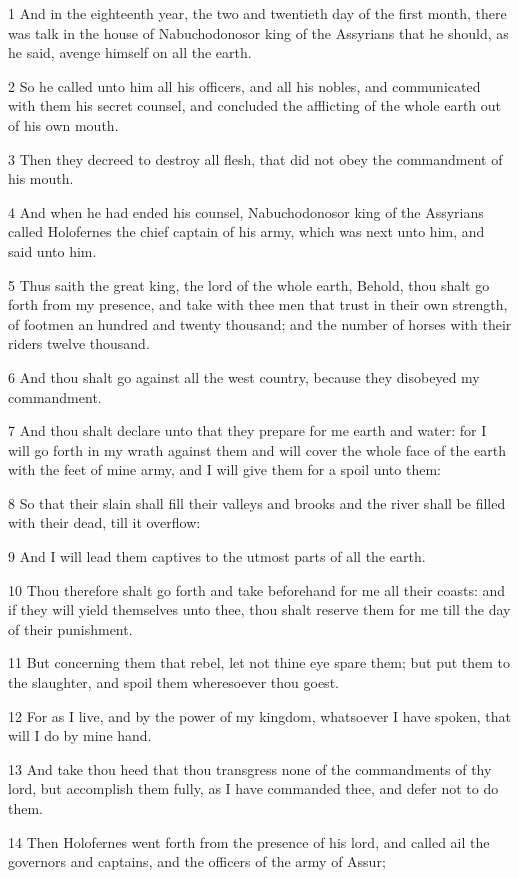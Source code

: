\par 1 And in the eighteenth year, the two and twentieth day of the first month, there was talk in the house of Nabuchodonosor king of the Assyrians that he should, as he said, avenge himself on all the earth.
\par 2 So he called unto him all his officers, and all his nobles, and communicated with them his secret counsel, and concluded the afflicting of the whole earth out of his own mouth.
\par 3 Then they decreed to destroy all flesh, that did not obey the commandment of his mouth.
\par 4 And when he had ended his counsel, Nabuchodonosor king of the Assyrians called Holofernes the chief captain of his army, which was next unto him, and said unto him.
\par 5 Thus saith the great king, the lord of the whole earth, Behold, thou shalt go forth from my presence, and take with thee men that trust in their own strength, of footmen an hundred and twenty thousand; and the number of horses with their riders twelve thousand.
\par 6 And thou shalt go against all the west country, because they disobeyed my commandment.
\par 7 And thou shalt declare unto that they prepare for me earth and water: for I will go forth in my wrath against them and will cover the whole face of the earth with the feet of mine army, and I will give them for a spoil unto them:
\par 8 So that their slain shall fill their valleys and brooks and the river shall be filled with their dead, till it overflow:
\par 9 And I will lead them captives to the utmost parts of all the earth.
\par 10 Thou therefore shalt go forth and take beforehand for me all their coasts: and if they will yield themselves unto thee, thou shalt reserve them for me till the day of their punishment.
\par 11 But concerning them that rebel, let not thine eye spare them; but put them to the slaughter, and spoil them wheresoever thou goest.
\par 12 For as I live, and by the power of my kingdom, whatsoever I have spoken, that will I do by mine hand.
\par 13 And take thou heed that thou transgress none of the commandments of thy lord, but accomplish them fully, as I have commanded thee, and defer not to do them.
\par 14 Then Holofernes went forth from the presence of his lord, and called ail the governors and captains, and the officers of the army of Assur;
